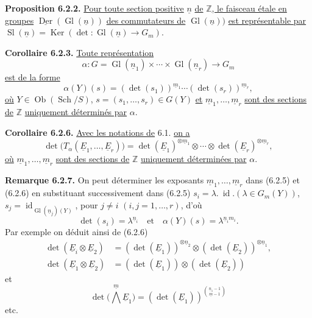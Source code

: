 \documentclass{article}
\newcommand{\Gl}{\operatorname{Gl}}
\newcommand{\Der}{\operatorname{Der}}
\newcommand{\Sch}{\operatorname{Sch}}
\newcommand{\Ker}{\operatorname{Ker}}
\begin{document}
\clearpage
\textbf{Proposition 6.2.2.} \uline{Pour toute section positive} \(\underline{n}\) \uline{de} \(\mathbb Z\)\uline{, le faisceau étale en groupes} \(\underline{\Der}(\Gl(\underline{n}))\) \uline{des commutateurs de} \(\Gl(\underline{n}))\) \uline{est représentable par}
\(\operatorname{Sl}(\underline{n})=\Ker(\det:\Gl(\underline{n})\to{G}_m)\).

\textbf{Corollaire 6.2.3.} \uline{Toute représentation}
\begin{equation}\tag{6.2.4}
 \alpha:G=\Gl(\underline{n}_1)\times\cdots\times\Gl(\underline{n}_r)\longrightarrow{G}_m
\end{equation}
\uline{est de la forme}
\begin{equation}\tag{6.2.5}
 \alpha(Y)(s)=(\det(s_1))^{\underline{m}_1}\cdots(\det(s_r))^{\underline{m}_r},
\end{equation}
\uline{où} \(Y\in\operatorname{Ob}(\Sch/S)\), \(s=(s_1,\ldots,s_r)\in G(Y)\) \uline{et} \(\underline{m}_1,\ldots,\underline{m}_r\) \uline{sont des sections de} \(\mathbb Z\) \uline{uniquement déterminés par} \(\alpha\).

\textbf{Corollaire 6.2.6.} \uline{Avec les notations de} 6.1. \uline{on a}
\[
 \det\bigl(T_\alpha(\underline{E}_1,\ldots,\underline{E}_r)\bigr)
 =
 \det(\underline{E}_1)^{\otimes \underline{m}_1}\otimes\cdots\otimes
 \det(\underline{E}_r)^{\otimes \underline{m}_r},
\]
\uline{où} \(\underline{m}_1,\ldots,\underline{m}_r\) \uline{sont des sections de} \(\mathbb Z\) \uline{uniquement déterminées par} \(\alpha\).

\textbf{Remarque 6.2.7.} On peut déterminer les exposants \(\underline{m}_1,\ldots,\underline{m}_r\) dans (6.2.5) et (6.2.6) en substituant successivement dans (6.2.5)
\(s_i=\lambda.\ \operatorname{id}.(\lambda\in{G}_m(Y))\), \(s_j=\operatorname{id}_{\Gl(\underline{n}_j)(Y)}\), pour \(j\ne i\) \((i,j=1,\ldots,r)\), d'où
\[
 \det(s_i)=\lambda^{\underline{n}_i}\quad\text{et}\quad
 \alpha(Y)(s)=\lambda^{\underline{n}_im_i}.
\]
Par exemple on déduit ainsi de (6.2.6)
\begin{align}
 \det(\underline{E}_i\otimes \underline{E}_2)&=(\det(\underline{E}_1))^{\otimes \underline{n}_2}\otimes(\det(\underline{E}_2))^{\otimes \underline{n}_1}, \tag{6.2.8}\\
 \det(\underline{E}_1\otimes \underline{E}_2)&=(\det(\underline{E}_1))\otimes(\det(\underline{E}_2)) \tag{6.2.9}
\end{align}
et
\begin{equation}\tag{6.2.10}
 \det\bigl(\bigwedge\limits^{\underline{m}} \underline{E}_1\bigr)=(\det(\underline{E}_1))^{\binom{\underline{n}_1-1}{\underline{m}-1}}
\end{equation}
etc.
\end{document}
